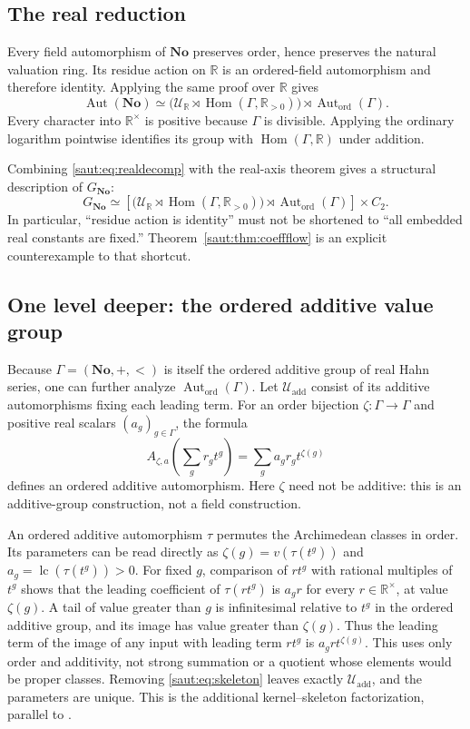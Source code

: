 \documentclass[11pt]{article}
\theoremstyle{definition}
\theoremstyle{remark}
\newcommand{\No}{\mathbf{No}}
\newcommand{\R}{\mathbb R}
\newcommand{\U}{\mathcal U}
\newcommand{\Aut}{\operatorname{Aut}}
\newcommand{\Hom}{\operatorname{Hom}}
\newcommand{\lc}{\operatorname{lc}}
\newcommand{\Gh}{\operatorname{Aut}_{\mathrm{ord}}(\Gamma)}
\numberwithin{equation}{section}
\begin{document}
\subsection{The real reduction}

Every field automorphism of $\No$ preserves order, hence preserves the
natural valuation ring. Its residue action on $\R$ is an ordered-field
automorphism and therefore identity. Applying the same proof over $\R$
gives
\begin{equation}\label{saut:eq:realdecomp}
 \Aut(\No)\simeq
 \bigl(\U_{\R}\rtimes\Hom(\Gamma,\R_{>0})\bigr)\rtimes\Gh.
\end{equation}
Every character into $\R^\times$ is positive because $\Gamma$ is divisible.
Applying the ordinary logarithm pointwise identifies its group with
$\Hom(\Gamma,\R)$ under addition.

Combining \eqref{saut:eq:realdecomp} with the real-axis theorem gives a structural
description of $G_{\No}$:
\begin{equation}\label{saut:eq:realaxisdecomp}
 G_{\No}\simeq
 \left[\bigl(\U_{\R}\rtimes\Hom(\Gamma,\R_{>0})\bigr)\rtimes\Gh\right]
 \times C_2.
\end{equation}
In particular, ``residue action is identity'' must not be shortened to
``all embedded real constants are fixed.'' Theorem~\ref{saut:thm:coeffflow}
is an explicit counterexample to that shortcut.

\subsection{One level deeper: the ordered additive value group}

Because $\Gamma=(\No,+,<)$ is itself the ordered additive group of real
Hahn series, one can further analyze $\Gh$. Let $\U_{\mathrm{add}}$ consist
of its additive automorphisms fixing each leading term. For an order
bijection $\zeta:\Gamma\to\Gamma$ and positive real scalars
$(a_g)_{g\in\Gamma}$, the formula
\begin{equation}\label{saut:eq:skeleton}
 A_{\zeta,a}\left(\sum_g r_gt^g\right)
 =\sum_g a_g r_g t^{\zeta(g)}
\end{equation}
defines an ordered additive automorphism. Here $\zeta$ need not be additive:
this is an additive-group construction, not a field construction.

An ordered additive automorphism $\tau$ permutes the Archimedean classes
in order. Its parameters can be read directly as
$\zeta(g)=v(\tau(t^g))$ and $a_g=\lc(\tau(t^g))>0$.
For fixed $g$, comparison of $rt^g$ with rational multiples of $t^g$
shows that the leading coefficient of $\tau(rt^g)$ is $a_gr$ for every
$r\in\R^\times$, at value $\zeta(g)$. A tail of value greater than $g$
is infinitesimal relative to $t^g$ in the ordered additive group, and its
image has value greater than $\zeta(g)$. Thus the leading term of the
image of any input with leading term $rt^g$ is
$a_grt^{\zeta(g)}$. This uses only order and additivity, not strong
summation or a quotient whose elements would be proper classes.
Removing \eqref{saut:eq:skeleton} leaves exactly
$\U_{\mathrm{add}}$, and the parameters are unique. This is the additional
kernel--skeleton factorization, parallel to \cite{KSG}.
\end{document}
